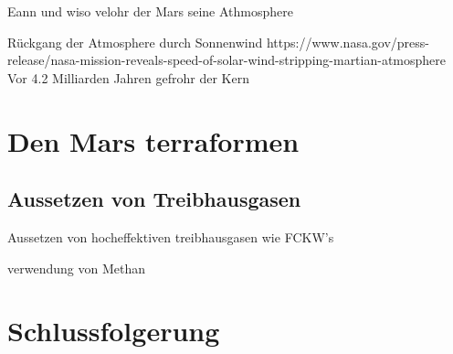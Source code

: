 \begin{refsection}
Eann und wiso velohr der Mars seine Athmosphere


Rückgang der Atmosphere durch Sonnenwind
	https://www.nasa.gov/press-release/nasa-mission-reveals-speed-of-solar-wind-stripping-martian-atmosphere
	Vor 4.2 Milliarden Jahren gefrohr der Kern


\section{Den Mars terraformen}



\subsection{Aussetzen von Treibhausgasen}

Aussetzen von hocheffektiven treibhausgasen wie FCKW's

verwendung von Methan 


\section{Schlussfolgerung}

\printbibliography[heading=subbibliography]
\end{refsection}
